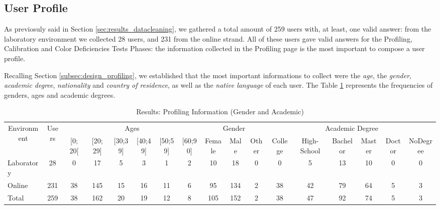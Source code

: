 \subsection{User Profile}
\label{subsec:results_userprofile}
%
As previosuly said in Section \ref{sec:results_datacleaning}, we gathered a total amount of 259 users with, at least, one valid answer: from the laboratory environment
we collected 28 users, and 231 from the online strand. All of these users gave valid answers for the Profiling, Calibration and Color Deficiencies Tests Phases: the information collected
in the Profiling page is the most important to compose a user profile. \par
%
Recalling Section \ref{subsec:design_profiling}, we established that the most important informations to collect were the \emph{age}, the \emph{gender}, \emph{academic degree},
\emph{nationality} and \emph{country of residence}, as well as the \emph{native language} of each user. The Table \ref{table:profiling_genderacademic} represents the frequencies of genders, ages and
academic degrees. \par
%
\begin{table}[htbp]
  \resizebox{\textwidth}{!} {
    \begin{tabular}{| l || c || c | c | c | c | c | c || c | c | c || c | c | c | c | c | c |}
      \hline
      \multicolumn{1}{|c||}{\multirow{2}{*}{Environment}} & \multirow{2}{*}{Users} & \multicolumn{6}{c||}{Ages}                                                           & \multicolumn{3}{c||}{Gender} & \multicolumn{6}{c|}{Academic Degree}                          \\ \cline{3-17}
      \multicolumn{1}{|c||}{}                             &                        & {[}0; 20{[} & {[}20; 29{]} & {[}30;39{]} & {[}40;49{]} & {[}50;59{]} & {[}60;90{]} & Female   & Male   & Other   & College & High-School & Bachelor & Master & Doctor & NoDegree \\ \hline
      Laboratory                                         & 28                     & 0           & 17           & 5           & 3           & 1           & 2            & 10       & 18     & 0        & 0       & 5           & 13       & 10     & 0      & 0        \\ \hline
      Online                                             & 231                    & 38          & 145          & 15          & 16          & 11          & 6            & 95       & 134    & 2        & 38      & 42          & 79       & 64     & 5      & 3        \\ \hline \hline
      Total                                              & 259                    & 38          & 162          & 20          & 19          & 12          & 8            & 105      & 152    & 2        & 38      & 47          & 92       & 74     & 5      & 3        \\ \hline
    \end{tabular}}
  \caption[Results: Profiling Information (Gender and Academic)]{Results: Profiling Information (Gender and Academic)}
  \label{table:profiling_genderacademic}
\end{table}
